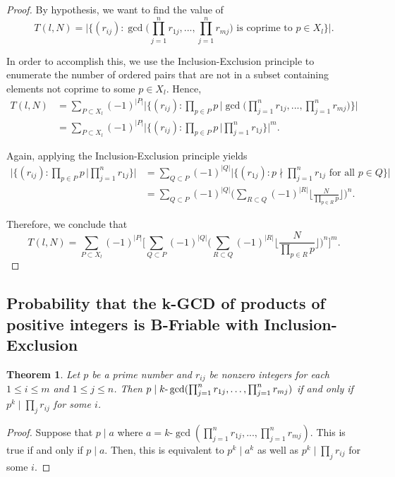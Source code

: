 \documentclass[12pt]{amsart}
\newtheorem{theorem}{Theorem}[subsection]
\theoremstyle{definition}
\begin{document}
\begin{proof}
By hypothesis, we want to find the value of
$$T(l,N) = \Big|\Big\{(r_{ij}) : \gcd\Big(\prod_{j=1}^nr_{1j}, ..., \prod_{j=1}^{n} r_{mj}\Big) \text{ is coprime to } p\in X_l \Big\}\Big|.$$
	
In order to accomplish this, we use the Inclusion-Exclusion principle to enumerate the number of ordered pairs that are not in a subset containing elements not coprime to some $p\in X_l$. Hence, 
	\begin{align*}
		T(l, N) &= \sum_{P\subset X_l}{(-1)^{|P|}}\Bigg|\Big\{(r_{ij}):\prod_{p\in P} p \, \Big| \gcd\Big(\prod_{j=1}^nr_{1j}, ... ,\prod_{j=1}^{n} r_{mj}\Big) \Big\} \Bigg|\\ &= \sum_{P\subset X_l}{(-1)^{|P|}} \Bigg|\Big\{(r_{ij}):\prod_{p\in P} p \, \Big| \prod_{j=1}^nr_{1j}\Big\}\Bigg|^m.
	\end{align*}
	
	\noindent Again, applying the Inclusion-Exclusion principle yields
	\begin{align*}
		\Bigg|\Big\{(r_{ij}):\prod_{p\in P} p \, \Big|\prod_{j=1}^nr_{1j}\Big\}\Bigg| &=\sum_{Q\subset P}(-1)^{|Q|}\Big|\Big\{(r_{1j}): p \nmid \prod_{j=1}^nr_{1j} \text{ for all } p\in Q \Big\}\Big|\\
		&=\sum_{Q\subset P}(-1)^{|Q|}\Biggl(\sum_{R\subset Q}(-1)^{|R|}\Biggl\lfloor\frac{N}{\prod_{p\in R} p}\Biggr\rfloor\Biggr)^n.
	\end{align*}
	
	\noindent Therefore, we conclude that
	$$T(l,N)=\sum_{P\subset X_l}{(-1)^{|P|}}\Bigg[\sum_{Q\subset P}(-1)^{|Q|}\Big(\sum_{R\subset Q}(-1)^{|R|}\Big\lfloor\frac{N}{\prod_{p\in R} p}\Big\rfloor\Big)^n\Bigg]^m.$$
\end{proof}

\subsection{Probability that the k-GCD of products of positive integers is  B-Friable with Inclusion-Exclusion}

\begin{theorem} Let $p$ be a prime number and $r_{ij}$ be nonzero integers for each $1 \leq i \leq m$ and $1 \leq j \leq n$. Then
	$p \mid k\text{-}\gcd(\prod_{j=1}^{n}r_{1j},\mathellipsis,\prod_{j=1}^n r_{mj})$ if and only if $p^k \mid \prod_{j}r_{ij}$ for some $i$.
\end{theorem}

\begin{proof}
	Suppose that $p \mid a$ where $a = k\text{-}\gcd(\prod_{j=1}^n r_{1j}, ...,\prod_{j=1}^n r_{mj})$. This is true if and only if $p \mid a$. Then, this is equivalent to $p^k \mid a^k$ as well as $p^k \mid \prod_j r_{ij}$ for some $i$.
\end{proof}
\end{document}
